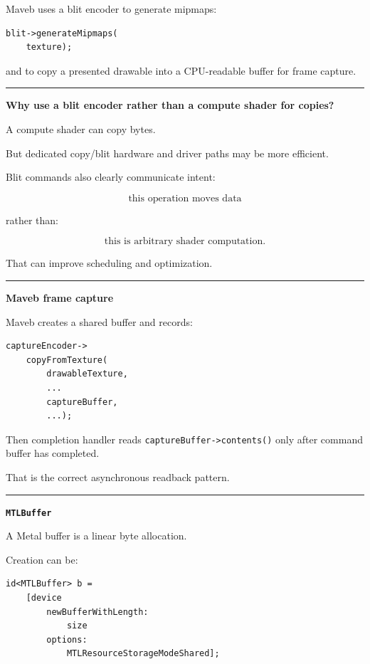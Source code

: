 Maveb uses a blit encoder to generate mipmaps:

\begin{verbatim}
blit->generateMipmaps(
    texture);
\end{verbatim}

and to copy a presented drawable into a CPU-readable buffer for frame capture.

\begin{center}\rule{0.5\linewidth}{0.5pt}\end{center}

\textbf{Why use a blit encoder rather than a compute shader for copies?}

A compute shader can copy bytes.

But dedicated copy/blit hardware and driver paths may be more efficient.

Blit commands also clearly communicate intent:

\[
\boxed{
\text{this operation moves data}
}
\]

rather than:

\[
\text{this is arbitrary shader computation}.
\]

That can improve scheduling and optimization.

\begin{center}\rule{0.5\linewidth}{0.5pt}\end{center}

\textbf{Maveb frame capture}

Maveb creates a shared buffer and records:

\begin{verbatim}
captureEncoder->
    copyFromTexture(
        drawableTexture,
        ...
        captureBuffer,
        ...);
\end{verbatim}

Then completion handler reads \texttt{captureBuffer-\textgreater{}contents()} only after command buffer has completed.

That is the correct asynchronous readback pattern.

\begin{center}\rule{0.5\linewidth}{0.5pt}\end{center}

\textbf{\texttt{MTLBuffer}}

A Metal buffer is a linear byte allocation.

Creation can be:

\begin{verbatim}
id<MTLBuffer> b =
    [device
        newBufferWithLength:
            size
        options:
            MTLResourceStorageModeShared];
\end{verbatim}

